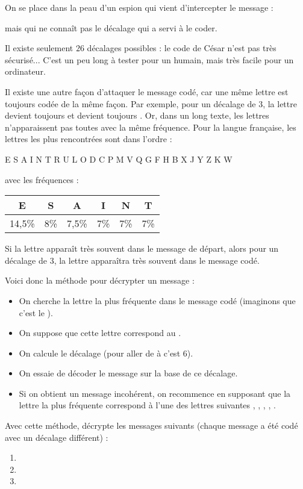 \documentclass[class=report,crop=false, 12pt]{standalone}
\begin{document}
\begin{activite}
On se place dans la peau d'un espion qui vient d'intercepter le message : 

\centerline{}
mais qui ne connaît pas le décalage qui a servi à le coder.

Il existe seulement $26$ décalages possibles : le code de César n'est pas très sécurisé... C'est un peu long à tester pour un humain, mais très facile pour un ordinateur.

Il existe une autre façon d'attaquer le message codé, car une même lettre est toujours codée de la même façon. Par exemple, pour un décalage de $3$, la lettre  devient toujours  et  devient toujours . Or, dans un long texte, les lettres n'apparaissent pas toutes avec la même fréquence.
Pour la langue française, les lettres les plus rencontrées sont dans l'ordre : \\
\centerline{E S A I N T R U L O D C P M V Q G F H B X J Y Z K W}
avec les fréquences :
\begin{center}
\begin{tabular}{|c|c|c|c|c|c|}
\hline
{E}&{S}&{A}&{I}&{N}&{T}\\
\hline
14,5\%&8\%&7,5\%&7\%&7\%&7\%\\
\hline
\end{tabular}
\end{center}

Si la lettre  apparaît très souvent dans le message de départ, alors pour un décalage de $3$, la lettre  apparaîtra très souvent dans le message codé.

Voici donc la méthode pour décrypter un message :
\begin{itemize}
  \item On cherche la lettre la plus fréquente dans le message codé (imaginons que c'est le ).
  \item On suppose que cette lettre correspond au .
  \item On calcule le décalage (pour aller de  à  c'est $6$).
  \item On essaie de décoder le message sur la base de ce décalage.
  \item Si on obtient un message incohérent, on recommence en supposant que la lettre la plus fréquente correspond à l'une des lettres suivantes , , , , .
\end{itemize}

Avec cette méthode, décrypte les messages suivants (chaque message a été codé avec un décalage différent) :

\begin{enumerate}
  \item {}
  \item {}
  \item {}
\end{enumerate}

\end{activite}
\end{document}
